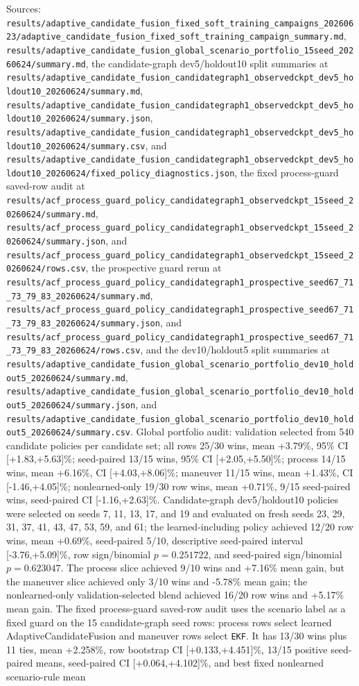 \begin{table}[t]
\scriptsize Sources: \nolinkurl{results/adaptive_candidate_fusion_fixed_soft_training_campaigns_20260623/adaptive_candidate_fusion_fixed_soft_training_campaign_summary.md}, \nolinkurl{results/adaptive_candidate_fusion_global_scenario_portfolio_15seed_20260624/summary.md}, the candidate-graph dev5/holdout10 split summaries at \nolinkurl{results/adaptive_candidate_fusion_candidategraph1_observedckpt_dev5_holdout10_20260624/summary.md}, \nolinkurl{results/adaptive_candidate_fusion_candidategraph1_observedckpt_dev5_holdout10_20260624/summary.json}, \nolinkurl{results/adaptive_candidate_fusion_candidategraph1_observedckpt_dev5_holdout10_20260624/summary.csv}, and \nolinkurl{results/adaptive_candidate_fusion_candidategraph1_observedckpt_dev5_holdout10_20260624/fixed_policy_diagnostics.json}, the fixed process-guard saved-row audit at \nolinkurl{results/acf_process_guard_policy_candidategraph1_observedckpt_15seed_20260624/summary.md}, \nolinkurl{results/acf_process_guard_policy_candidategraph1_observedckpt_15seed_20260624/summary.json}, and \nolinkurl{results/acf_process_guard_policy_candidategraph1_observedckpt_15seed_20260624/rows.csv}, the prospective guard rerun at \nolinkurl{results/acf_process_guard_policy_candidategraph1_prospective_seed67_71_73_79_83_20260624/summary.md}, \nolinkurl{results/acf_process_guard_policy_candidategraph1_prospective_seed67_71_73_79_83_20260624/summary.json}, and \nolinkurl{results/acf_process_guard_policy_candidategraph1_prospective_seed67_71_73_79_83_20260624/rows.csv}, and the dev10/holdout5 split summaries at \nolinkurl{results/adaptive_candidate_fusion_global_scenario_portfolio_dev10_holdout5_20260624/summary.md}, \nolinkurl{results/adaptive_candidate_fusion_global_scenario_portfolio_dev10_holdout5_20260624/summary.json}, and \nolinkurl{results/adaptive_candidate_fusion_global_scenario_portfolio_dev10_holdout5_20260624/summary.csv}. Global portfolio audit: validation selected from 540 candidate policies per candidate set; all rows 25/30 wins, mean +3.79\%, 95\% CI [+1.83,+5.63]\%; seed-paired 13/15 wins, 95\% CI [+2.05,+5.50]\%; process 14/15 wins, mean +6.16\%, CI [+4.03,+8.06]\%; maneuver 11/15 wins, mean +1.43\%, CI [-1.46,+4.05]\%; nonlearned-only 19/30 row wins, mean +0.71\%, 9/15 seed-paired wins, seed-paired CI [-1.16,+2.63]\%. Candidate-graph dev5/holdout10 policies were selected on seeds 7, 11, 13, 17, and 19 and evaluated on fresh seeds 23, 29, 31, 37, 41, 43, 47, 53, 59, and 61; the learned-including policy achieved 12/20 row wins, mean +0.69\%, seed-paired 5/10, descriptive seed-paired interval [-3.76,+5.09]\%, row sign/binomial \(p=0.251722\), and seed-paired sign/binomial \(p=0.623047\). The process slice achieved 9/10 wins and +7.16\% mean gain, but the maneuver slice achieved only 3/10 wins and -5.78\% mean gain; the nonlearned-only validation-selected blend achieved 16/20 row wins and +5.17\% mean gain. The fixed process-guard saved-row audit uses the scenario label as a fixed guard on the 15 candidate-graph seed rows: process rows select learned AdaptiveCandidateFusion and maneuver rows select \texttt{EKF}. It has 13/30 wins plus 11 ties, mean +2.258\%, row bootstrap CI [+0.133,+4.451]\%, 13/15 positive seed-paired means, seed-paired CI [+0.064,+4.102]\%, and best fixed nonlearned scenario-rule mean 
\end{table}
